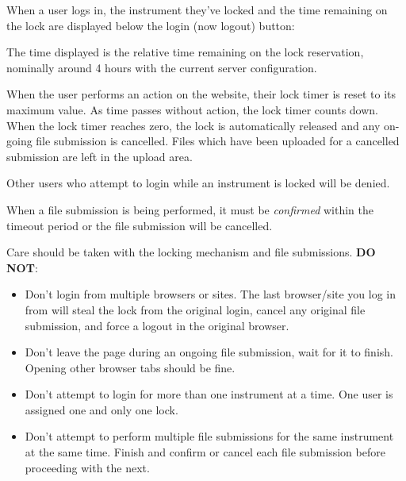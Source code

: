 \documentclass[letterpaper,10pt,english]{sphinxmanual}
\begin{document}
When a user logs in,  the instrument they've locked and the time remaining on the
lock are displayed below the login (now logout) button:
\begin{figure}[htbp]
\centering

\end{figure}

The time displayed is the relative time remaining on the lock reservation,  nominally
around 4 hours with the current server configuration.

When the user performs an action on the website,  their lock timer is reset to its maximum value.
As time passes without action,  the lock timer counts down.  When the lock timer reaches zero,
the lock is automatically released and any on-going file submission is cancelled.   Files which
have been uploaded for a cancelled submission are left in the upload area.

Other users who attempt to login while an instrument is locked will be denied.

When a file submission is being performed,  it must be \emph{confirmed} within the timeout period
or the file submission will be cancelled.

Care should be taken with the locking mechanism and file submissions.  \textbf{DO NOT}:
\begin{itemize}
\item {} 
Don't login from multiple browsers or sites.   The last browser/site you log in from will steal the
lock from the original login, cancel any original file submission,  and force a logout in the original browser.

\item {} 
Don't leave the page during an ongoing file submission,  wait for it to finish.   Opening other browser
tabs should be fine.

\item {} 
Don't attempt to login for more than one instrument at a time.  One user is assigned one and only one lock.

\item {} 
Don't attempt to perform multiple file submissions for the same instrument at the same time.  Finish
and confirm or cancel each file submission before proceeding with the next.

\end{itemize}
\end{document}
